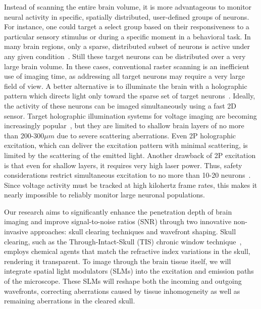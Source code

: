 Instead of scanning the entire brain volume, it is more advantageous to monitor neural activity in specific, spatially distributed, user-defined groups of neurons. For instance, one could target a select group based on their responsiveness to a particular sensory stimulus or during a specific moment in a behavioral task. In many brain regions, only a sparse, distributed subset of neurons is active under any given condition~\cite{poo2009odor,diamantaki2016sparse,hromadka2008sparse,crochet2011synaptic,peron2015cellular,tang2018large}. Still these target neurons can be distributed over a very large brain volume. In these cases, conventional raster scanning is an inefficient use of imaging time, as addressing all target neurons may require a very large field of view. A better alternative is to illuminate the brain with a holographic pattern which directs light only toward the sparse set of target neurons~\cite{Yang2018Holographic,mardinly2018precise,pegard2017three,hernandez2016three,nikolenko2008slm,dal2010simultaneous,ronzitti2017recent,vaziri2012reshaping,yang2016simultaneous,dana2014hybrid,dana2012remotely}. Ideally, the activity of these neurons can be imaged simultaneously using a fast 2D sensor. Target holographic illumination systems for voltage imaging are becoming increasingly popular~\cite{Sims2024Scanless,Xiao2024LargeScale}, but they are limited to shallow brain layers of no more than 200-300$\mu m$  due to severe scattering aberrations. Even 2P holographic excitation, which can deliver the excitation pattern with minimal scattering, is limited by the scattering of the emitted light. Another drawback of 2P excitation is that even for shallow layers, it requires very high laser power. Thus, safety considerations restrict simultaneous excitation to no more than 10-20 neurons~\cite{Davis2024Optical}. Since voltage activity must be tracked at high kilohertz frame rates, this makes it nearly impossible to reliably monitor large neuronal populations.



Our research aims to significantly enhance the penetration depth of brain imaging and improve signal-to-noise ratios (SNR) through two innovative non-invasive approaches: skull clearing techniques and wavefront shaping. Skull clearing, such as the Through-Intact-Skull (TIS) chronic window technique~\cite{Li2022TIS}, employs chemical agents that match the refractive index variations in the skull, rendering it transparent. To image through the brain tissue itself, we will integrate spatial light modulators (SLMs) into the excitation and emission paths of the microscope. These SLMs will reshape both the incoming and outgoing wavefronts, correcting aberrations caused by tissue inhomogeneity as well as remaining aberrations in the cleared skull.

